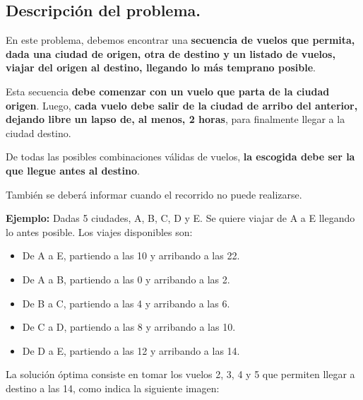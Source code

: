 \subsection{Descripción del problema.}

\vspace*{0.3cm}

En este problema, debemos encontrar una \textbf{secuencia de vuelos que
permita, dada una ciudad de origen, otra de destino y un listado de vuelos,
viajar del origen al destino, llegando lo más temprano posible}.

Esta secuencia \textbf{debe comenzar con un vuelo que parta de la ciudad
origen}. Luego, \textbf{cada vuelo debe salir de la ciudad de arribo del
anterior, dejando libre un lapso de, al menos, 2 horas}, para finalmente
llegar a la ciudad destino.

De todas las posibles combinaciones válidas de vuelos, \textbf{la escogida
debe ser la que llegue antes al destino}.

También se deberá informar cuando el recorrido no puede realizarse.

\vspace*{0.5cm}

\textbf{Ejemplo:}
Dadas 5 ciudades, A, B, C, D y E. Se quiere viajar de A a E llegando lo
antes posible.
Los viajes disponibles son:
\begin{itemize}
  \item De A a E, partiendo a las 10 y arribando a las 22.
  \item De A a B, partiendo a las 0 y arribando a las 2.
  \item De B a C, partiendo a las 4 y arribando a las 6.
  \item De C a D, partiendo a las 8 y arribando a las 10.
  \item De D a E, partiendo a las 12 y arribando a las 14.
\end{itemize}

La solución óptima consiste en tomar los vuelos 2, 3, 4 y 5 que permiten
llegar a destino a las 14, como indica la siguiente imagen:

